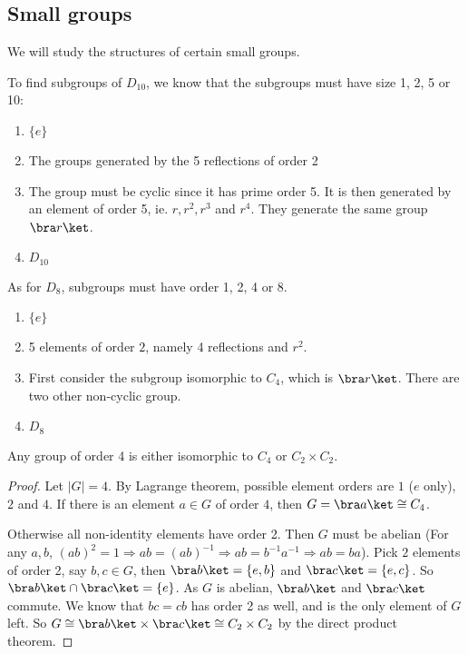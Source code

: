 \documentclass[a4paper]{article}
\begin{document}
\subsection{Small groups}
We will study the structures of certain small groups.
\begin{eg}
  To find subgroups of $D_{10}$, we know that the subgroups must have size 1, 2, 5 or 10:
  \begin{enumerate}[label=\arabic{*}:]
    \item $\{e\}$
    \item The groups generated by the 5 reflections of order 2
      \setcounter{enumi}{4}
    \item The group must be cyclic since it has prime order 5. It is then generated by an element of order 5, ie. $r, r^2, r^3$ and $r^4$. They generate the same group $\bra r\ket$.
      \setcounter{enumi}{9}
    \item $D_{10}$
  \end{enumerate}

  As for $D_8$, subgroups must have order 1, 2, 4 or 8.
  \begin{enumerate}[label=\arabic{*}:]
    \item $\{e\}$
    \item 5 elements of order $2$, namely 4 reflections and $r^2$.
      \setcounter{enumi}{3}
    \item First consider the subgroup isomorphic to $C_4$, which is $\bra r\ket$. There are two other non-cyclic group.
      \setcounter{enumi}{7}
    \item $D_8$
  \end{enumerate}
\end{eg}

\begin{prop}
  Any group of order 4 is either isomorphic to $C_4$ or $C_2\times C_2$.
\end{prop}

\begin{proof}
  Let $|G| = 4$. By Lagrange theorem, possible element orders are $1$ ($e$ only), $2$ and $4$. If there is an element $a\in G$ of order $4$, then $G = \bra a\ket \cong C_4$.

  Otherwise all non-identity elements have order 2. Then $G$ must be abelian (For any $a, b$, $(ab)^2 = 1 \Rightarrow ab = (ab)^{-1} \Rightarrow ab = b^{-1}a^{-1} \Rightarrow ab = ba$).
  Pick $2$ elements of order 2, say $b, c\in G$, then $\bra b\ket=\{e, b\}$ and $\bra c\ket = \{e, c\}$. So $\bra b\ket\cap \bra c\ket = \{e\}$. As $G$ is abelian, $\bra b\ket$ and $\bra c\ket$ commute. We know that $bc = cb$ has order 2 as well, and is the only element of $G$ left. So $G \cong \bra b\ket\times \bra c\ket \cong C_2\times C_2$ by the direct product theorem.
\end{proof}
\end{document}
